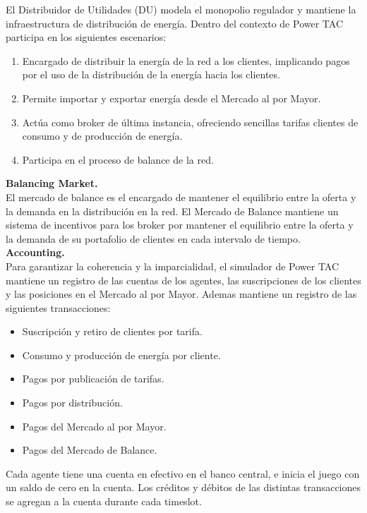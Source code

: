 El Distribuidor de Utilidades (DU) modela el monopolio regulador y mantiene la infraestructura de distribución de energía. Dentro del contexto de Power TAC participa en los siguientes escenarios:

\begin{enumerate}
	\item Encargado de distribuir la energía de la red a los clientes, implicando pagos por el uso de la distribución de la energía hacia los clientes.
	\item Permite importar y exportar energía desde el Mercado al por Mayor.
	\item Actúa como broker de última instancia, ofreciendo sencillas tarifas clientes de consumo y de producción de energía.
	\item Participa en el proceso de balance de la red.
\end{enumerate}

\textbf{Balancing Market.}\\

El mercado de balance es el encargado de mantener el equilibrio entre la oferta y la demanda en la distribución en la red. 
El Mercado de Balance mantiene un sistema de incentivos para los broker por mantener el equilibrio entre la oferta y la demanda de su portafolio de clientes en cada intervalo de tiempo.\\

\textbf{Accounting.}\\

Para garantizar la coherencia y la imparcialidad, el simulador de Power TAC mantiene un registro de las cuentas de los agentes, las suscripciones de los clientes y las posiciones en el Mercado al por Mayor. Ademas mantiene un registro de las siguientes transacciones:

\begin{itemize}
	\item Suscripción y retiro de clientes por tarifa.
	\item Consumo y producción de energía por cliente.
	\item Pagos por publicación de tarifas.
	\item Pagos por distribución.
	\item Pagos del Mercado al por Mayor.
	\item Pagos del Mercado de Balance.    
\end{itemize}

Cada agente tiene una cuenta en efectivo en el banco central, e inicia el juego con un saldo de cero en la cuenta. Los créditos y débitos de las distintas transacciones se agregan a la cuenta durante cada timeslot.\\

